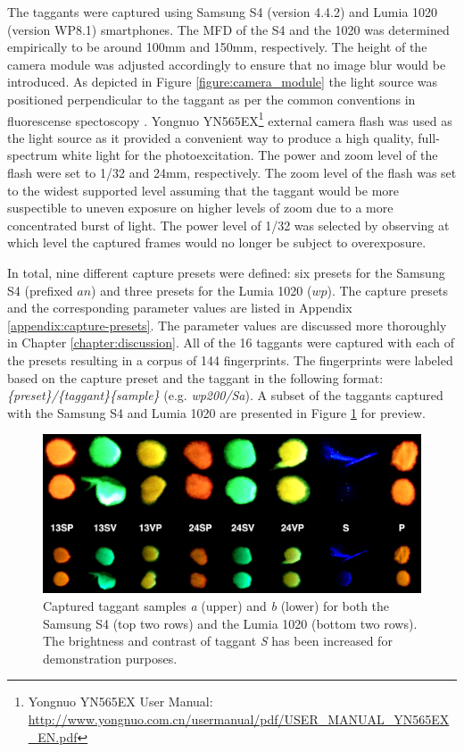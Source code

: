 \documentclass[thesis.tex]{subfiles}
\begin{document}
The taggants were captured using Samsung S4 (version 4.4.2) and Lumia 1020 (version WP8.1) smartphones. The MFD of the S4 and the 1020 was determined empirically to be around 100mm and 150mm, respectively. The height of the camera module was adjusted accordingly to ensure that no image blur would be introduced. As depicted in Figure \ref{figure:camera_module} the light source was positioned perpendicular to the taggant as per the common conventions in fluorescense spectoscopy \cite{spectroscopy-principles}. Yongnuo YN565EX\footnote{Yongnuo YN565EX User Manual: \url{http://www.yongnuo.com.cn/usermanual/pdf/USER_MANUAL_YN565EX_EN.pdf}} external camera flash was used as the light source as it provided a convenient way to produce a high quality, full-spectrum white light for the photoexcitation. The power and zoom level of the flash were set to 1/32 and 24mm, respectively. The zoom level of the flash was set to the widest supported level assuming that the taggant would be more suspectible to uneven exposure on higher levels of zoom due to a more concentrated burst of light. The power level of 1/32 was selected by observing at which level the captured frames would no longer be subject to overexposure.

In total, nine different capture presets were defined: six presets for the Samsung S4 (prefixed $an$) and three presets for the Lumia 1020 ($wp$). The capture presets and the corresponding parameter values are listed in Appendix \ref{appendix:capture-presets}. The parameter values are discussed more thoroughly in Chapter \ref{chapter:discussion}. All of the 16 taggants were captured with each of the presets resulting in a corpus of 144 fingerprints. The fingerprints were labeled based on the capture preset and the taggant in the following format: \emph{\{preset\}/\{taggant\}\{sample\}} (e.g. \emph{wp200/Sa}). A subset of the taggants captured with the Samsung S4 and Lumia 1020 are presented in Figure \ref{figure:taggants} for preview.

\begin{figure}[h]
\label{figure:taggants}
\centering \includegraphics[width=\textwidth,height=\textheight,keepaspectratio=true]{images/experiment/taggants}
\caption{Captured taggant samples \emph{a} (upper) and \emph{b} (lower) for both the Samsung S4 (top two rows) and the Lumia 1020 (bottom two rows). The brightness and contrast of taggant \emph{S} has been increased for demonstration purposes.}
\end{figure}
\clearpage
\end{document}
